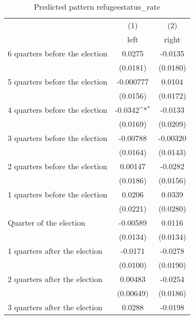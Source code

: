 \begin{table}[htbp]\centering
\def\sym#1{\ifmmode^{#1}\else\(^{#1}\)\fi}
\caption{Predicted pattern refugeestatus\_rate}
\begin{tabular}{l*{2}{c}}
\hline\hline
                    &\multicolumn{1}{c}{(1)}&\multicolumn{1}{c}{(2)}\\
                    &\multicolumn{1}{c}{left}&\multicolumn{1}{c}{right}\\
\hline
 6 quarters before the election&      0.0275         &     -0.0135         \\
                    &    (0.0181)         &    (0.0180)         \\
[1em]
 5 quarters before the election&   -0.000777         &      0.0104         \\
                    &    (0.0156)         &    (0.0172)         \\
[1em]
 4 quarters before the election&     -0.0342\sym{*}  &     -0.0133         \\
                    &    (0.0169)         &    (0.0209)         \\
[1em]
 3 quarters before the election&    -0.00788         &    -0.00320         \\
                    &    (0.0164)         &    (0.0143)         \\
[1em]
 2 quarters before the election&     0.00147         &     -0.0282         \\
                    &    (0.0186)         &    (0.0156)         \\
[1em]
 1 quarters before the election&      0.0206         &      0.0339         \\
                    &    (0.0221)         &    (0.0280)         \\
[1em]
Quarter of the election&    -0.00589         &      0.0116         \\
                    &    (0.0134)         &    (0.0134)         \\
[1em]
 1 quarters after the election&     -0.0171         &     -0.0278         \\
                    &    (0.0100)         &    (0.0190)         \\
[1em]
 2 quarters after the election&     0.00483         &     -0.0254         \\
                    &   (0.00649)         &    (0.0186)         \\
[1em]
 3 quarters after the election&      0.0288         &     -0.0198         \\

\end{tabular}
\end{table}

